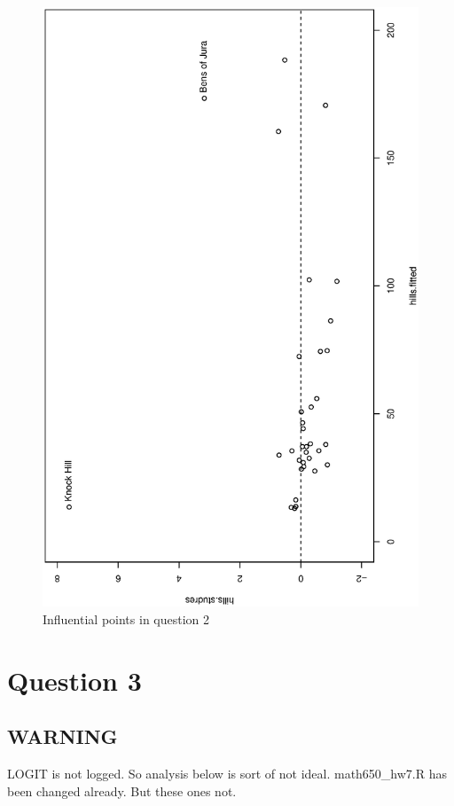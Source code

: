 \documentclass[a4paper,10pt]{article}
\begin{document}
\begin{figure}
\includegraphics[angle=-90, width=1\textwidth]{figures/math650_hw7_fig1.eps}
\caption{Influential points in question 2}\label{f1}
\end{figure}

\section{Question 3}
\subsection{WARNING}
LOGIT is not logged. So analysis below is sort of not ideal. math650\_hw7.R has been changed already. But these ones not.
\end{document}
